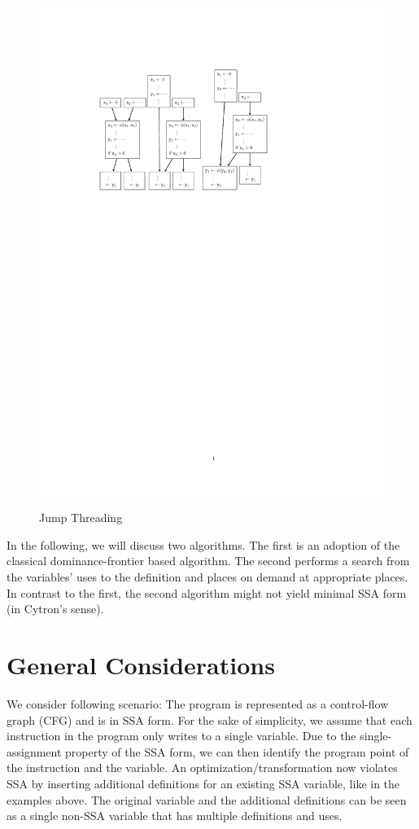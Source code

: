 \begin{figure}[htbp]
\begin{center}
{			\includegraphics{jump_thread_repair.pdf}
		}
	\end{center}
	\caption{Jump Threading}
	\label{fig:threading}
\end{figure}


In the following, we will discuss two algorithms.
The first is an adoption of the classical dominance-frontier based algorithm.
The second performs a search from the variables' uses to the definition and places \phifuns on demand at appropriate places. 
In contrast to the first, the second algorithm might not yield minimal SSA form (in Cytron's sense).

\section{General Considerations}
We consider following scenario:
The program is represented as a control-flow graph (CFG) and is in SSA form.
For the sake of simplicity, we assume that each instruction in the program only writes to a single variable.
Due to the single-assignment property of the SSA form, we can then identify the program point of the instruction and the variable. 
An optimization/transformation now violates SSA by inserting additional definitions for an existing SSA variable, like in the examples above.
The original variable and the additional definitions can be seen as a single non-SSA variable that has multiple definitions and uses.


